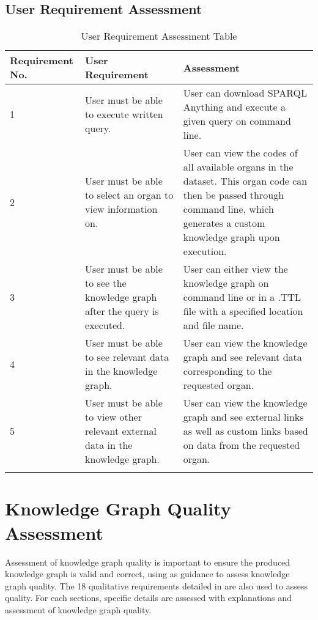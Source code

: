 \subsection{User Requirement Assessment}

\begin{longtable}{|p{2.25cm}|p{4.5cm}|p{6.5cm}|}
\hline
\textbf{Requirement No.} & \textbf{User Requirement} & \textbf{Assessment}\\
\hline

1& 
User must be able to execute written query. &
User can download SPARQL Anything \cite{sparqlanythinggithub} and execute a given query on command line. \\
\hline

2&
User must be able to select an organ to view information on. &
User can view the codes of all available organs in the dataset. This organ code can then be passed through command line, which generates a custom knowledge graph upon execution. \\
\hline

3&
User must be able to see the knowledge graph after the query is executed. &
User can either view the knowledge graph on command line or in a .TTL file with a specified location and file name. \\
\hline

4&
User must be able to see relevant data in the knowledge graph. &
User can view the knowledge graph and see relevant data corresponding to the requested organ. \\
\hline

5&
User must be able to view other relevant external data in the knowledge graph. &
User can view the knowledge graph and see external links as well as custom links based on data from the requested organ. \\ 
\hline

\caption{User Requirement Assessment Table}
\end{longtable}
\vspace{-1.1cm}

\section{Knowledge Graph Quality Assessment}
\hspace{0.5cm} Assessment of knowledge graph quality is important to ensure the produced knowledge graph is valid and correct, using \cite{knowledgegraphevaulationbook} as guidance to assess knowledge graph quality. The 18 qualitative requirements detailed in \cite{evaluationpaper} are also used to assess quality. For each sections, specific details are assessed with explanations and assessment of knowledge graph quality. 

